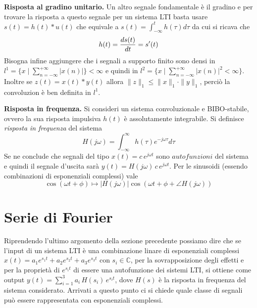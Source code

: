 \documentclass[a4paper,portrait,12pt]{article}
\theoremstyle{definition}
\begin{document}
\textbf{Risposta al gradino unitario.} Un altro segnale fondamentale è il gradino e per trovare la risposta
a questo segnale per un sistema LTI basta usare $s(t) = h(t) \ast u(t)$ che equivale a $s(t) = 
\int_{-\infty}^t h(\tau)d\tau$ da cui si ricava che
\begin{equation}
h(t) = {d s(t) \over dt} = s'(t)
\end{equation}
Bisogna infine aggiungere che i segnali a supporto finito sono densi in $l^1 = \{x \mid 
\sum_{n=-\infty}^{+\infty}\left|x(n)\right|\} < \infty $ e quindi in $l^2 = \{x \mid 
\sum_{n=-\infty}^{+\infty}\left|x(n)\right|^2 < \infty\}$.\\
Inoltre se $z(t) = x(t) \ast y(t)$ allora $\parallel z \parallel_1 \le \parallel x \parallel_1 \cdot
\parallel y \parallel_1$, perciò la convoluzion è ben definita in $l^1$. 
\bigskip

\textbf{Risposta in frequenza.} Si consideri un sistema convoluzionale e BIBO-stabile, ovvero la sua risposta
impulsiva $h(t)$ è assolutamente integrabile. Si definisce \textit{risposta in frequenza} del sistema
\begin{equation}
H(j \omega) = \int_{-\infty}^{\infty} h(\tau) e^{-j\omega \tau} d\tau
\end{equation}
Se ne conclude che segnali del tipo $x(t) = c\,e^{j\omega t}$ sono $autofunzioni$ del sistema e quindi il
segnale d'uscita sarà $y(t) = H(j\omega)\,c\,e^{j\omega t}$. Per le sinusoidi (essendo combinazioni di
esponenziali complessi) vale
\begin{equation}
\cos(\omega t + \phi) \mapsto \left|H(j\omega)\right| \cos(\omega t + \phi + \angle H(j \omega))
\end{equation}
\bigskip


\section{Serie di Fourier}

Riprendendo l'ultimo argomento della sezione precedente possiamo dire che se l'input di un sistema LTI è 
una combinazione linare di esponenziali complessi $x(t) = a_1e^{s_1t}+a_2e^{s_2t}+a_3e^{s_3t}$ con 
$s_i\in\mathbb{C}$, per la sovrapposizione degli effetti e per la proprietà di
$e^{s_it}$ di essere una autofunzione dei sistemi LTI, si ottiene come output 
$y(t) = \sum_{i=1}^3 a_i\,H(s_i)\,e^{s_it}$,
dove $H(s)$ è la risposta in frequenza del sistema considerato. Arrivati a questo punto ci si chiede quale
classe di segnali può essere rappresentata con esponenziali complessi. 
\bigskip
\end{document}
